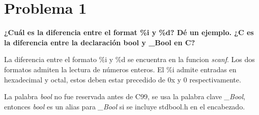 \section*{Problema 1}
\textbf{¿Cuál es la diferencia entre el format \%i y \%d? Dé un ejemplo. ¿C es la diferencia entre la declaración bool y \_Bool en C?}

La diferencia entre el formato \%i y \%d se encuentra en la funcion \textit{scanf}. Los dos formatos admiten la lectura de números enteros. El \%i admite entradas en hexadecimal y octal, estos deben estar precedido de 0x y 0 respectivamente.

La palabra \textit{bool} no fue reservada antes de C99, se usa la palabra clave \textit{\_Bool}, entonces \textit{bool} es un alias para \textit{\_Bool} si se incluye stdbool.h en el encabezado.